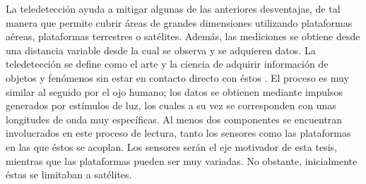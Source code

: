 La teledetección ayuda a mitigar algunas de las anteriores desventajas, de tal manera que permite cubrir áreas de grandes dimensiones utilizando plataformas aéreas, plataformas terrestres o satélites. Además, las mediciones se obtiene desde una distancia variable desde la cual se observa y se adquieren datos. La teledetección se define como el arte y la ciencia de adquirir información de objetos y fenómenos sin estar en contacto directo con éstos \cite{lillesand_remote_2015}. El proceso es muy similar al seguido por el ojo humano; los datos se obtienen mediante impulsos generados por estímulos de luz, los cuales a su vez se corresponden con unas longitudes de onda muy específicas. Al menos dos componentes se encuentran involucrados en este proceso de lectura, tanto los sensores como las plataformas en las que éstos se acoplan. Los sensores serán el eje motivador de esta tesis, mientras que las plataformas pueden ser muy variadas. No obstante, inicialmente éstas se limitaban a satélites. 

